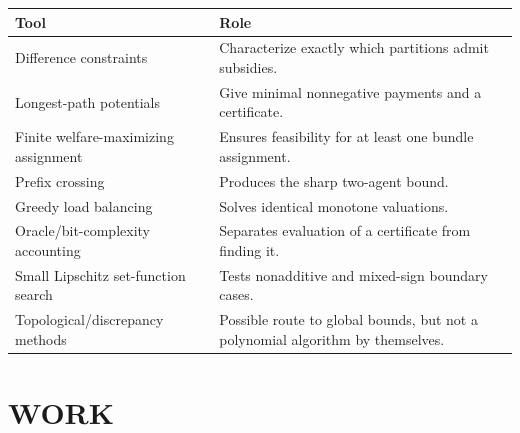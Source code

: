 \documentclass[11pt,a4paper]{article}
\theoremstyle{remark}\newtheorem{remark}[theorem]{Remark}
\begin{document}
\begin{center}\begin{tabular}{p{.25\linewidth}p{.66\linewidth}}\toprule Tool&Role\\\midrule
Difference constraints&Characterize exactly which partitions admit subsidies.\\
Longest-path potentials&Give minimal nonnegative payments and a certificate.\\
Finite welfare-maximizing assignment&Ensures feasibility for at least one bundle assignment.\\
Prefix crossing&Produces the sharp two-agent bound.\\
Greedy load balancing&Solves identical monotone valuations.\\
Oracle/bit-complexity accounting&Separates evaluation of a certificate from finding it.\\
Small Lipschitz set-function search&Tests nonadditive and mixed-sign boundary cases.\\
Topological/discrepancy methods&Possible route to global bounds, but not a polynomial algorithm by themselves.\\\bottomrule\end{tabular}\end{center}

\section{WORK}
\end{document}
